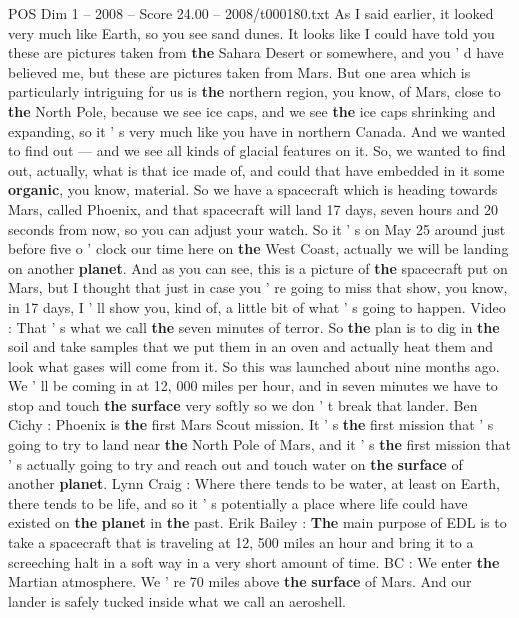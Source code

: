 \begin{textsample}{POS Dim 1 – 2008 – Score 24.00 – 2008/t000180.txt}
As I said earlier, it looked very much like Earth, so you see sand dunes.
It looks like I could have told you these are pictures taken from \textbf{the} Sahara Desert or somewhere, and you ' d have believed me, but these are pictures taken from Mars.
But one area which is particularly intriguing for us is \textbf{the} northern region, you know, of Mars, close to \textbf{the} North Pole, because we see ice caps, and we see \textbf{the} ice caps shrinking and expanding, so it ' s very much like you have in northern Canada.
And we wanted to find out — and we see all kinds of glacial features on it.
So, we wanted to find out, actually, what is that ice made of, and could that have embedded in it some \textbf{organic}, you know, material.
So we have a spacecraft which is heading towards Mars, called Phoenix, and that spacecraft will land 17 days, seven hours and 20 seconds from now, so you can adjust your watch.
So it ' s on May 25 around just before five o ' clock our time here on \textbf{the} West Coast, actually we will be landing on another \textbf{planet}.
And as you can see, this is a picture of \textbf{the} spacecraft put on Mars, but I thought that just in case you ' re going to miss that show, you know, in 17 days, I ' ll show you, kind of, a little bit of what ' s going to happen.
Video : That ' s what we call \textbf{the} seven minutes of terror.
So \textbf{the} plan is to dig in \textbf{the} soil and take samples that we put them in an oven and actually heat them and look what gases will come from it.
So this was launched about nine months ago.
We ' ll be coming in at 12, 000 miles per hour, and in seven minutes we have to stop and touch \textbf{the} \textbf{surface} very softly so we don ' t break that lander.
Ben Cichy : Phoenix is \textbf{the} first Mars Scout mission.
It ' s \textbf{the} first mission that ' s going to try to land near \textbf{the} North Pole of Mars, and it ' s \textbf{the} first mission that ' s actually going to try and reach out and touch water on \textbf{the} \textbf{surface} of another \textbf{planet}.
Lynn Craig : Where there tends to be water, at least on Earth, there tends to be life, and so it ' s potentially a place where life could have existed on \textbf{the} \textbf{planet} in \textbf{the} past.
Erik Bailey : \textbf{The} main purpose of EDL is to take a spacecraft that is traveling at 12, 500 miles an hour and bring it to a screeching halt in a soft way in a very short amount of time.
BC : We enter \textbf{the} Martian atmosphere.
We ' re 70 miles above \textbf{the} \textbf{surface} of Mars.
And our lander is safely tucked inside what we call an aeroshell.

\end{textsample}
